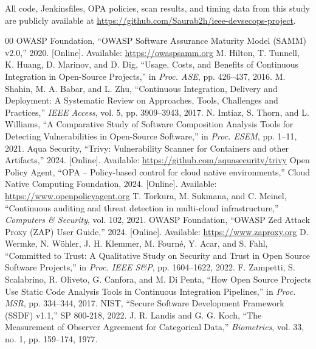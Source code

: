 \documentclass[conference]{IEEEtran}
\begin{document}
All code, Jenkinsfiles, OPA policies, scan results, and timing data from this study are publicly available at \url{https://github.com/Saurab2h/ieee-devsecops-project}.

\begin{thebibliography}{00}
 OWASP Foundation, ``OWASP Software Assurance Maturity Model (SAMM) v2.0,'' 2020. [Online]. Available: \url{https://owaspsamm.org}
 M. Hilton, T. Tunnell, K. Huang, D. Marinov, and D. Dig, ``Usage, Costs, and Benefits of Continuous Integration in Open-Source Projects,'' in \emph{Proc. ASE}, pp. 426--437, 2016.
 M. Shahin, M. A. Babar, and L. Zhu, ``Continuous Integration, Delivery and Deployment: A Systematic Review on Approaches, Tools, Challenges and Practices,'' \emph{IEEE Access}, vol. 5, pp. 3909--3943, 2017.
 N. Imtiaz, S. Thorn, and L. Williams, ``A Comparative Study of Software Composition Analysis Tools for Detecting Vulnerabilities in Open-Source Software,'' in \emph{Proc. ESEM}, pp. 1--11, 2021.
 Aqua Security, ``Trivy: Vulnerability Scanner for Containers and other Artifacts,'' 2024. [Online]. Available: \url{https://github.com/aquasecurity/trivy}
 Open Policy Agent, ``OPA -- Policy-based control for cloud native environments,'' Cloud Native Computing Foundation, 2024. [Online]. Available: \url{https://www.openpolicyagent.org}
 T. Torkura, M. Sukmana, and C. Meinel, ``Continuous auditing and threat detection in multi-cloud infrastructure,'' \emph{Computers \& Security}, vol. 102, 2021.
 OWASP Foundation, ``OWASP Zed Attack Proxy (ZAP) User Guide,'' 2024. [Online]. Available: \url{https://www.zaproxy.org}
 D. Wermke, N. Wöhler, J. H. Klemmer, M. Fourné, Y. Acar, and S. Fahl, ``Committed to Trust: A Qualitative Study on Security and Trust in Open Source Software Projects,'' in \emph{Proc. IEEE S\&P}, pp. 1604--1622, 2022.
 F. Zampetti, S. Scalabrino, R. Oliveto, G. Canfora, and M. Di Penta, ``How Open Source Projects Use Static Code Analysis Tools in Continuous Integration Pipelines,'' in \emph{Proc. MSR}, pp. 334--344, 2017.
 NIST, ``Secure Software Development Framework (SSDF) v1.1,'' SP 800-218, 2022.
 J. R. Landis and G. G. Koch, ``The Measurement of Observer Agreement for Categorical Data,'' \textit{Biometrics}, vol. 33, no. 1, pp. 159--174, 1977.
\end{thebibliography}
\end{document}
